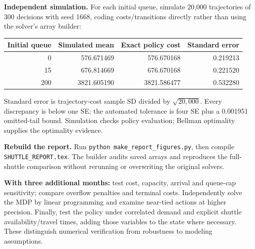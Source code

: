 \documentclass[11pt,letterpaper]{article}
\begin{document}
\textbf{Independent simulation.} For each initial queue, simulate 20,000 trajectories of 300 decisions with seed 1668, coding costs/transitions directly rather than using the solver's array builder:
\begin{center}\small
\begin{tabular}{rrrr}\toprule
Initial queue & Simulated mean & Exact policy cost & Standard error\\\midrule
0 & 576.671469 & 576.670168 & 0.219213\\
15 & 676.814669 & 676.670168 & 0.221520\\
200 & 3821.605190 & 3821.586477 & 0.532280\\\bottomrule
\end{tabular}\end{center}
Standard error is trajectory-cost sample SD divided by $\sqrt{20{,}000}$. Every discrepancy is below one SE; the automated tolerance is four SE plus a 0.001951 omitted-tail bound. Simulation checks policy evaluation; Bellman optimality supplies the optimality evidence.

\textbf{Rebuild the report.} Run \texttt{python make\_report\_figures.py}, then compile \texttt{SHUTTLE\_REPORT.tex}. The builder audits saved arrays and reproduces the full-shuttle comparison without rerunning or overwriting the original solvers.

\textbf{With three additional months:} test cost, capacity, arrival and queue-cap sensitivity; compare overflow penalties and terminal costs. Independently solve the MDP by linear programming and examine near-tied actions at higher precision. Finally, test the policy under correlated demand and explicit shuttle availability/travel times, adding those variables to the state where necessary. These distinguish numerical verification from robustness to modeling assumptions.
\end{document}
